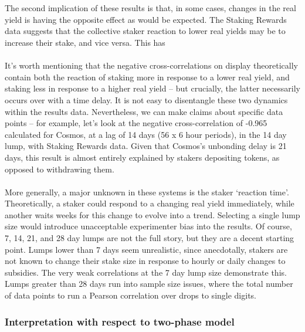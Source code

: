 \documentclass[longbibliography,nofootinbib]{revtex4-1}
\begin{document}
\\\\
The second implication of these results is that, in some cases, changes in the real yield is having the opposite effect as would be expected. The Staking Rewards data suggests that the collective staker reaction to lower real yields may be to increase their stake, and vice versa. This has 
\\\\
It's worth mentioning that the negative cross-correlations on display theoretically contain both the reaction of staking more in response to a lower real yield, and staking less in response to a higher real yield – but crucially, the latter necessarily occurs over with a time delay. It is not easy to disentangle these two dynamics within the results data. Nevertheless, we can make claims about specific data points – for example, let's look at the negative cross-correlation of -0.965 calculated for Cosmos, at a lag of 14 days (56 x 6 hour periods), in the 14 day lump, with Staking Rewards data. Given that Cosmos's unbonding delay is 21 days, this result is almost entirely explained by stakers depositing tokens, as opposed to withdrawing them. 
\\\\
More generally, a major unknown in these systems is the staker `reaction time'. Theoretically, a staker could respond to a changing real yield immediately, while another waits weeks for this change to evolve into a trend. Selecting a single lump size would introduce unacceptable experimenter bias into the results. Of course, 7, 14, 21, and 28 day lumps are not the full story, but they are a decent starting point. Lumps lower than 7 days seem unrealistic, since anecdotally, stakers are not known to change their stake size in response to hourly or daily changes to subsidies. The very weak correlations at the 7 day lump size demonstrate this. Lumps greater than 28 days run into sample size issues, where the total number of data points to run a Pearson correlation over drops to single digits.

\subsubsection{Interpretation with respect to two-phase model}
\end{document}
